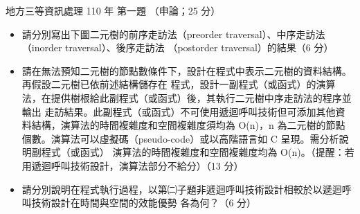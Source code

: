 \begin{pastexam}[label={px:df3-110-ds-01}]{地方三等資訊處理 110 年 第一題}
（申論；25 分）

\begin{itemize}[leftmargin=2.2em]
\item[㈠] 請分別寫出下圖二元樹的前序走訪法（preorder traversal）、中序走訪法（inorder traversal）、後序走訪法
（postorder traversal）的結果（6 分）
\item[㈡] 請在無法預知二元樹的節點數條件下，設計在程式中表示二元樹的資料結構。再假設二元樹已依前述結構儲存在
程式，設計一副程式（或函式）的演算法，在提供樹根給此副程式（或函式）後，其執行二元樹中序走訪法的程序並輸出
走訪結果。此副程式（或函式）不可使用遞迴呼叫技術但可添加其他資料結構，演算法的時間複雜度和空間複雜度須均為
O(n)，n 為二元樹的節點個數。演算法可以虛擬碼（pseudo-code）或以高階語言如 C 呈現。需分析說明副程式（或函式）
演算法的時間複雜度和空間複雜度均為 O(n)。（提醒：若用遞迴呼叫技術設計，演算法部分不給分）（13 分）
\item[㈢] 請分別說明在程式執行過程，以第㈡子題非遞迴呼叫技術設計相較於以遞迴呼叫技術設計在時間與空間的效能優勢
各為何？（6 分）
\end{itemize}
\begin{center}
\end{center}
\end{pastexam}

